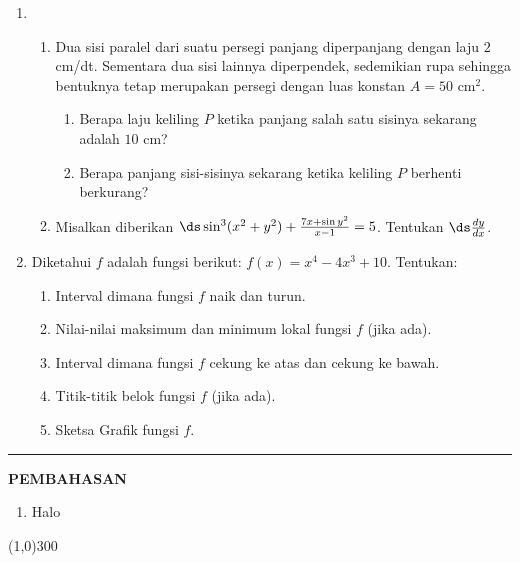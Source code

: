 \begin{enumerate}[leftmargin=*, label={\arabic*}.]
\item 
\begin{enumerate}[label={\alph*}.]
    \item Dua sisi paralel dari suatu persegi panjang diperpanjang dengan laju 
    $2$ cm/dt. Sementara dua sisi lainnya diperpendek, sedemikian rupa sehingga 
    bentuknya tetap merupakan persegi dengan luas konstan $A=50$ cm$^2$.
    \begin{enumerate}[label={\roman*}.]
        \item Berapa laju keliling $P$ ketika panjang salah satu sisinya sekarang 
        adalah $10$ cm?
        \item Berapa panjang sisi-sisinya sekarang ketika keliling $P$ berhenti 
        berkurang?
    \end{enumerate}
    \item Misalkan diberikan $\ds\sin^{3}(x^2+y^2)+\frac{7x+\sin y^{2}}{x-1}=5$.
    Tentukan $\ds\frac{dy}{dx}$.
\end{enumerate}
\item Diketahui $f$ adalah fungsi berikut: $f(x)=x^{4}-4x^{3}+10$. Tentukan:
\begin{enumerate}[label={\alph*}.]
    \item Interval dimana fungsi $f$ naik dan turun.
    \item Nilai-nilai maksimum dan minimum lokal fungsi $f$ (jika ada).
    \item Interval dimana fungsi $f$ cekung ke atas dan cekung ke bawah.
    \item Titik-titik belok fungsi $f$ (jika ada).
    \item Sketsa Grafik fungsi $f$.
\end{enumerate}

\end{enumerate}
\vspace{0.2cm}
\hrule height 1pt
\vspace{0.5cm}
\begin{center}
    \textbf{\large{PEMBAHASAN}}
\end{center}
\begin{enumerate}[leftmargin=*, label={\arabic*}.]
\item Halo

\end{enumerate}

\begin{center}
    \line(1,0){300}
\end{center}
